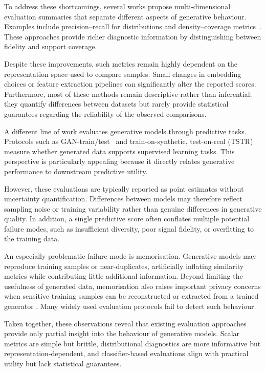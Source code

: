 To address these shortcomings, several works propose multi-dimensional
evaluation summaries that separate different aspects of generative behaviour.
Examples include precision--recall for distributions
\citep{sajjadi2018assessing,kynkaanniemi2019improved} and density--coverage
metrics~\citep{naeem2020reliable}. These approaches provide richer diagnostic
information by distinguishing between fidelity and support coverage.

Despite these improvements, such metrics remain highly dependent on the
representation space used to compare samples. Small changes in embedding
choices or feature extraction pipelines can significantly alter the reported
scores. Furthermore, most of these methods remain descriptive rather than
inferential: they quantify differences between datasets but rarely provide
statistical guarantees regarding the reliability of the observed comparisons.

A different line of work evaluates generative models through predictive tasks.
Protocols such as GAN-train/test~\citep{shmelkov2018good} and
train-on-synthetic, test-on-real (TSTR)
\citep{hyland2017real,esteban2017real,yoon2019timegan} measure whether
generated data supports supervised learning tasks. This perspective is
particularly appealing because it directly relates generative performance to
downstream predictive utility.

However, these evaluations are typically reported as point estimates without
uncertainty quantification. Differences between models may therefore reflect
sampling noise or training variability rather than genuine differences in
generative quality. In addition, a single predictive score often conflates
multiple potential failure modes, such as insufficient diversity, poor signal
fidelity, or overfitting to the training data.

An especially problematic failure mode is memorisation. Generative models may
reproduce training samples or near-duplicates, artificially inflating
similarity metrics while contributing little additional information.
Beyond limiting the usefulness of generated data, memorisation also raises
important privacy concerns when sensitive training samples can be reconstructed
or extracted from a trained generator
\citep{bhattacharjee2023data,carlini2023extracting,hayes2019logan,chen2020ganleaks}.
Many widely used evaluation protocols fail to detect such behaviour.

Taken together, these observations reveal that existing evaluation approaches
provide only partial insight into the behaviour of generative models.
Scalar metrics are simple but brittle, distributional diagnostics are more
informative but representation-dependent, and classifier-based evaluations
align with practical utility but lack statistical guarantees.

